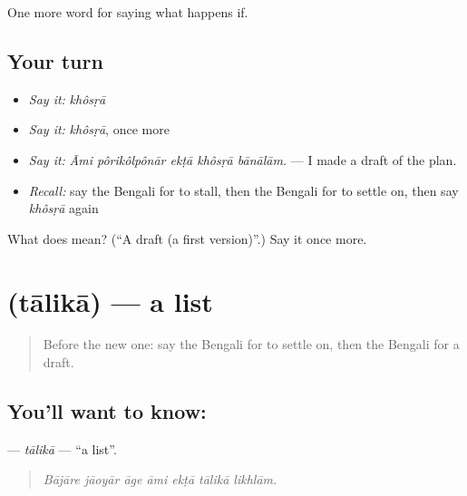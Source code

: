 \begin{grammarlens}[title={What you've built}]
One more word for saying what happens if.
\end{grammarlens}

\subsection*{Your turn}
\begin{itemize}
\raggedright
  \item \emph{Say it:} \emph{khôsṛā}
  \item \emph{Say it:} \emph{khôsṛā}, once more
  \item \emph{Say it:} \emph{Āmi pôrikôlpônār ekṭā khôsṛā bānālām.} — I made a draft of the plan.
  \item \emph{Recall:} say the Bengali for to stall, then the Bengali for to settle on, then say \emph{khôsṛā} again
\end{itemize}

\begin{tcolorbox}[breakable,colback=teal!4,colframe=teal!35!black,title={Before you move on}]
What does  mean? (\textquotedblleft{}A draft (a first version)\textquotedblright{}.) Say it once more.
\end{tcolorbox}
\section[\texorpdfstring{\bn{তালিকা} (tālikā)}{তালিকা (tālikā)}]{ (tālikā) — a list}

\label{lesson:BN-C531-talika}



\begin{quote}
Before the new one: say the Bengali for to settle on, then the Bengali for a draft.
\end{quote}

\subsection*{You'll want to know: }
\textbf{} — \emph{tālikā} — \textquotedblleft{}a list\textquotedblright{}.

\begin{quote}
      
\end{quote}

\begin{quote}
\emph{Bājāre jāoyār āge āmi ekṭā tālikā likhlām.}
\end{quote}

